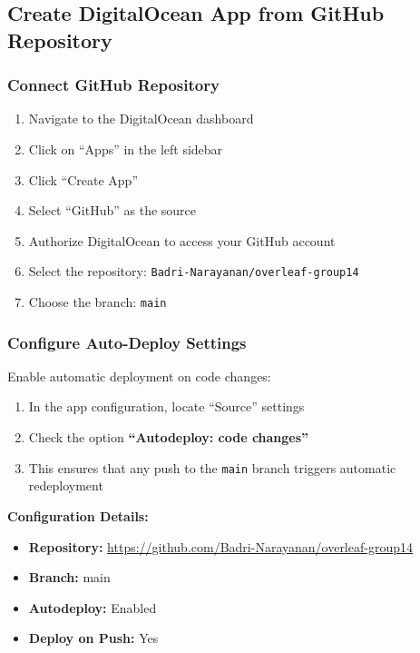 \subsection{Create DigitalOcean App from GitHub Repository}

\subsubsection{Connect GitHub Repository}

\begin{enumerate}
    \item Navigate to the DigitalOcean dashboard
    \item Click on ``Apps'' in the left sidebar
    \item Click ``Create App''
    \item Select ``GitHub'' as the source
    \item Authorize DigitalOcean to access your GitHub account
    \item Select the repository: \texttt{Badri-Narayanan/overleaf-group14}
    \item Choose the branch: \texttt{main}
\end{enumerate}

\subsubsection{Configure Auto-Deploy Settings}

Enable automatic deployment on code changes:

\begin{enumerate}
    \item In the app configuration, locate ``Source'' settings
    \item Check the option \textbf{``Autodeploy: code changes''}
    \item This ensures that any push to the \texttt{main} branch triggers automatic redeployment
\end{enumerate}

\textbf{Configuration Details:}
\begin{itemize}
    \item \textbf{Repository:} \url{https://github.com/Badri-Narayanan/overleaf-group14}
    \item \textbf{Branch:} main
    \item \textbf{Autodeploy:} Enabled
    \item \textbf{Deploy on Push:} Yes
\end{itemize}

